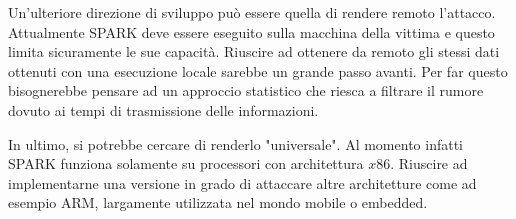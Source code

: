 		Un'ulteriore direzione di sviluppo può essere quella di rendere remoto l'attacco. Attualmente SPARK deve essere eseguito sulla macchina della vittima e questo limita sicuramente le sue capacità. Riuscire ad ottenere da remoto gli stessi dati ottenuti con una esecuzione locale sarebbe un grande passo avanti. Per far questo bisognerebbe pensare ad un approccio statistico che riesca a filtrare il rumore dovuto ai tempi di trasmissione delle informazioni.
		
		In ultimo, si potrebbe cercare di renderlo "universale". Al momento infatti SPARK funziona solamente su processori con architettura $x86$. Riuscire ad implementarne una versione in grado di attaccare altre architetture come ad esempio \ac{ARM}, largamente utilizzata nel mondo mobile o embedded.
	
	
	
